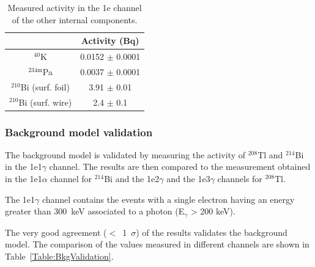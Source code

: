 \documentclass[main.tex]{subfiles}
\begin{document}
\begin{table}
\centering
\begin{tabular}{c|c}
 & Activity (Bq) \\
\midrule
$^{\text{40}}$K                 & 0.0152 $\pm$ 0.0001 \\ [0.05cm]
$^{\text{234m}}$Pa              & 0.0037 $\pm$ 0.0001 \\ [0.05cm]
$^{\text{210}}$Bi (surf. foil)  & 3.91   $\pm$ 0.01   \\ [0.05cm]
$^{\text{210}}$Bi (surf. wire)  & 2.4    $\pm$ 0.1    \\ [0.05cm]
\bottomrule
\end{tabular}
\caption{Measured activity in the 1e channel of the other internal components. }
\label{Table1e-activityMeasurement}
\end{table}



\FloatBarrier




\subsubsection{Background model validation}


\NI The background model is validated by measuring the activity of $^{\text{208}}$Tl and $^{\text{214}}$Bi in the 1e1$\gamma$ channel. The results are then compared to the measurement obtained in the 1e1$\alpha$ channel for $^{\text{214}}$Bi and the 1e2$\gamma$ and the 1e3$\gamma$ channels for $^{\text{208}}$Tl.


\bigskip


\NI The 1e1$\gamma$ channel contains the events with a single electron having an energy greater than 300~keV associated to a photon (E$_{\gamma}$ > 200 keV). 


\bigskip


\NI The very good agreement ($<$~1~$\sigma$) of the results validates the background model. The comparison of the values measured in different channels are shown in Table~\ref{Table:BkgValidation}.
\end{document}

